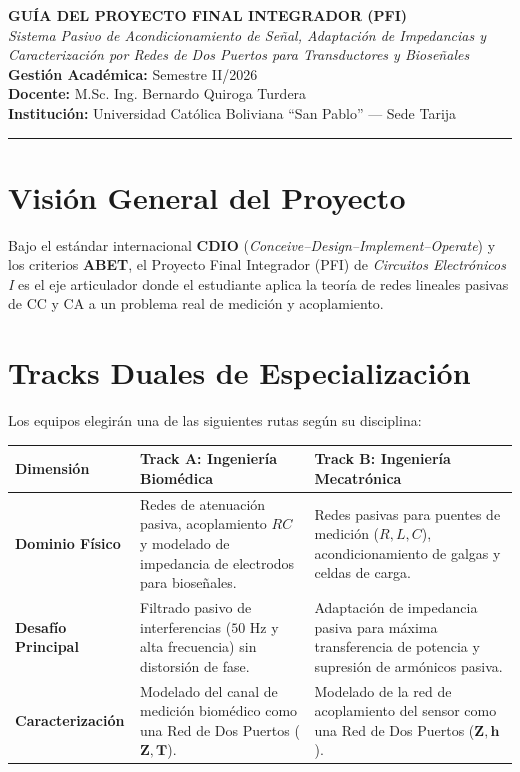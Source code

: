 \documentclass[11pt, a4paper]{article}
\begin{document}
\begin{center}
    \vspace*{0.5cm}
    \LARGE \textbf{GUÍA DEL PROYECTO FINAL INTEGRADOR (PFI)} \\
    \vspace{0.5cm}
    \Large \textit{Sistema Pasivo de Acondicionamiento de Señal, Adaptación de Impedancias y Caracterización por Redes de Dos Puertos para Transductores y Bioseñales} \\
    \vspace{0.8cm}
    \normalsize
    \textbf{Gestión Académica:} Semestre II/2026 \\
    \textbf{Docente:} M.Sc. Ing. Bernardo Quiroga Turdera \\
    \textbf{Institución:} Universidad Católica Boliviana ``San Pablo'' --- Sede Tarija
    \vspace{1cm}
\end{center}

\hrule
\vspace{0.5cm}

\section{Visión General del Proyecto}
Bajo el estándar internacional \textbf{CDIO} (\textit{Conceive--Design--Implement--Operate}) y los criterios \textbf{ABET}, el Proyecto Final Integrador (PFI) de \textit{Circuitos Electrónicos I} es el eje articulador donde el estudiante aplica la teoría de redes lineales pasivas de CC y CA a un problema real de medición y acoplamiento.

\section{Tracks Duales de Especialización}
Los equipos elegirán una de las siguientes rutas según su disciplina:

\vspace{0.3cm}
\noindent
\begin{tabularx}{\textwidth}{@{} p{3.5cm} X X @{}}
\toprule
\textbf{Dimensión} & \textbf{Track A: Ingeniería Biomédica} & \textbf{Track B: Ingeniería Mecatrónica} \\ \midrule
\textbf{Dominio Físico} & Redes de atenuación pasiva, acoplamiento $RC$ y modelado de impedancia de electrodos para bioseñales. & Redes pasivas para puentes de medición ($R, L, C$), acondicionamiento de galgas y celdas de carga. \\ \addlinespace
\textbf{Desafío Principal} & Filtrado pasivo de interferencias ($50\text{ Hz}$ y alta frecuencia) sin distorsión de fase. & Adaptación de impedancia pasiva para máxima transferencia de potencia y supresión de armónicos pasiva. \\ \addlinespace
\textbf{Caracterización} & Modelado del canal de medición biomédico como una Red de Dos Puertos ($\mathbf{Z}, \mathbf{T}$). & Modelado de la red de acoplamiento del sensor como una Red de Dos Puertos ($\mathbf{Z}, \mathbf{h}$). \\ \bottomrule
\end{tabularx}
\vspace{0.3cm}
\end{document}
